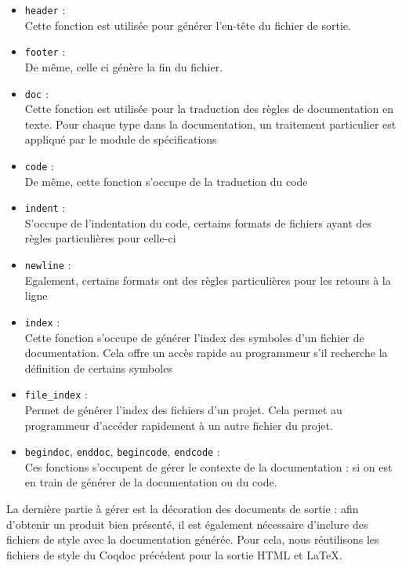 \documentclass[a4paper, 11pt]{report}
\begin{document}
    \begin{itemize}
      \item \texttt{header}     : \\
        Cette fonction est utilisée pour générer l'en-tête du fichier de
        sortie.
      \item \texttt{footer}     : \\
        De même, celle ci génère la fin du fichier.
      \item \texttt{doc}        : \\
        Cette fonction est utilisée pour la traduction des règles de
        documentation en texte. Pour chaque type dans la documentation, un
        traitement particulier est appliqué par le module de spécifications
      \item \texttt{code}       : \\
        De même, cette fonction s'occupe de la traduction du code
      \item \texttt{indent}     : \\
        S'occupe de l'indentation du code, certains formats de fichiers ayant des
        règles particulières pour celle-ci
      \item \texttt{newline}    : \\
        Egalement, certains formats ont des règles particulières pour les
        retours à la ligne
      \item \texttt{index}      : \\
        Cette fonction s'occupe de générer l'index des symboles d'un fichier
        de documentation. Cela offre un accès rapide au programmeur s'il
        recherche la définition de certains symboles
      \item \texttt{file\_index} : \\
        Permet de générer  l'index des fichiers d'un projet. Cela permet
        au programmeur d'accéder rapidement à un autre fichier du projet.

      \item \texttt{begindoc}, \texttt{enddoc}, \texttt{begincode}, \texttt{endcode} : \\
        Ces fonctions s'occupent de gérer le contexte de la documentation :
        si on est en train de générer de la documentation ou du code.
    \end{itemize}

    La dernière partie à gérer est la décoration des documents de sortie :
    afin d'obtenir un produit bien présenté, il est également nécessaire
    d'inclure des fichiers de style avec la documentation générée. Pour cela,
    nous réutilisons les fichiers de style du Coqdoc précédent pour la sortie
    HTML et LaTeX.
\end{document}
